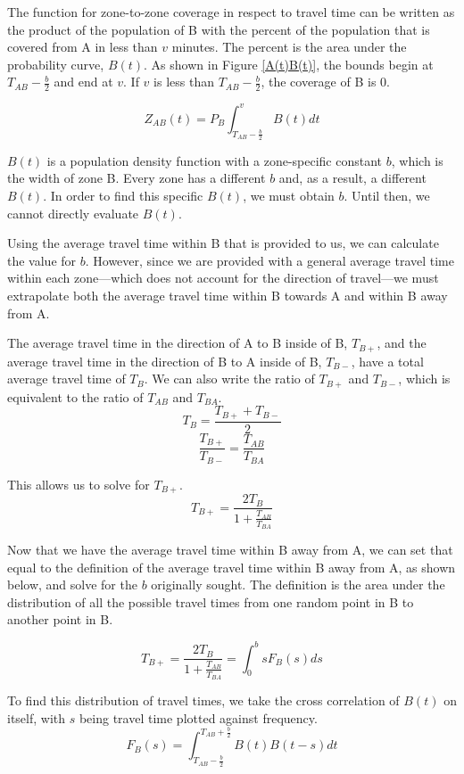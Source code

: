\documentclass[notitlepage, 12pt]{article}
\begin{document}

The function for zone-to-zone coverage in respect to travel time can be written as the product of the population of B with the percent of the population that is covered from A in less than $v$ minutes. The percent is the area under the probability curve, $B(t)$. As shown in Figure \ref{A(t)B(t)}, the bounds begin at $T_{AB} - \frac{b}{2}$ and end at $v$. If $v$ is less than $T_{AB} - \frac{b}{2}$, the coverage of B is 0.

$$Z_{AB}(t) = P_B \int^v_{T_{AB} - \frac{b}{2}} B(t) dt$$

$B(t)$ is a population density function with a zone-specific constant $b$, which is the width of zone B. Every zone has a different $b$ and, as a result, a different $B(t)$. In order to find this specific $B(t)$, we must obtain $b$. Until then, we cannot directly evaluate $B(t)$. 

Using the average travel time within B that is provided to us, we can calculate the value for $b$. However, since we are provided with a general average travel time within each zone---which does not account for the direction of travel---we must extrapolate both the average travel time within B towards A and within B away from A. 

The average travel time in the direction of A to B inside of B, $T_{B+}$, and the average travel time in the direction of B to A
inside of B, $T_{B-}$, have a total average travel time of $T_B$. We can also write the ratio of $T_{B+}$ and $T_{B-}$,
which is equivalent to the ratio of $T_{AB}$ and $T_{BA}$.
$$T_B = \frac{T_{B+} + T_{B-}}{2}$$
$$\frac{T_{B+}}{T_{B-}} = \frac{T_{AB}}{T_{BA}}$$

This allows us to solve for $T_{B+}$.
$$T_{B+} = \frac {2T_B}{1+ \frac{T_{AB}}{T_{BA}}}$$

Now that we have the average travel time within B away from A, we can set that equal to the definition of the average travel time within B away from A, as shown below, and solve for the $b$ originally sought. The definition is  the area under the distribution of all the possible travel times from one random point in B to another point in B.

$$T_{B+} = \frac {2T_B}{1+ \frac{T_{AB}}{T_{BA}}} = \int^b_0 s F_B(s) ds$$

To find this distribution of travel times, we take the cross correlation of $B(t)$ on itself, with $s$ being  travel time plotted against frequency.
$$F_B(s) =\int^{T_{AB} + \frac{b}{2}}_{T_{AB} - \frac{b}{2}} B(t) B(t-s) dt$$
\end{document}
